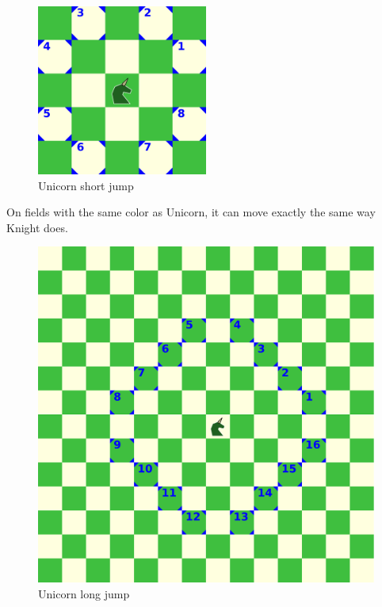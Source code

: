 \documentclass[a5paper,12pt,draft]{book} %
\begin{document}
\vspace{8\baselineskip}

\noindent
\begin{figure}
\includegraphics[width=0.5\textwidth, keepaspectratio=true]{../gfx/examples/10_move_unicorn_same_color.png}
\caption{Unicorn short jump}
\label{fig:unicorn_short}
\end{figure}
On fields with the same color as Unicorn, it can move exactly the
same way Knight does.

\clearpage

\noindent
\begin{figure}[!h]
\includegraphics[width=1.0\textwidth, keepaspectratio=true]{../gfx/examples/11_move_unicorn_opposite_color.png}
\caption{Unicorn long jump}
\label{fig:unicorn_long}
\end{figure}
\end{document}

